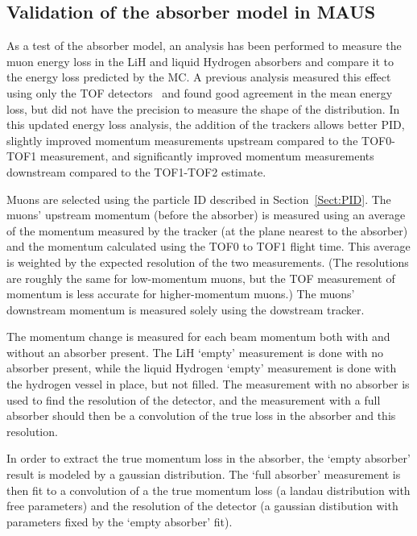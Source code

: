 \subsection{Validation of the absorber model in MAUS}
\label{SubSect:Absorber_Validation}

As a test of the absorber model, an analysis has been performed to measure the muon energy loss in the LiH and liquid Hydrogen absorbers and compare it to the energy loss predicted by the MC.  A previous analysis measured this effect using only the TOF detectors~\cite{rhys_thesis} and found good agreement in the mean energy loss, but did not have the precision to measure the shape of the distribution.  In this updated energy loss analysis, the addition of the trackers allows better PID, slightly improved momentum measurements upstream compared to the TOF0-TOF1 measurement, and significantly improved momentum measurements downstream compared to the TOF1-TOF2 estimate.

Muons are selected using the particle ID described in Section~\ref{Sect:PID}.  The muons' upstream momentum (before the absorber) is measured using an average of the momentum measured by the tracker (at the plane nearest to the absorber) and the momentum calculated using the TOF0 to TOF1 flight time.  This average is weighted by the expected resolution of the two measurements. (The resolutions are roughly the same for low-momentum muons, but the TOF measurement of momentum is less accurate for higher-momentum muons.)  The muons' downstream momentum is measured solely using the dowstream tracker.

The momentum change is measured for each beam momentum both with and without an absorber present.  The LiH `empty' measurement is done with no absorber present, while the liquid Hydrogen `empty' measurement is done with the hydrogen vessel in place, but not filled.  The measurement with no absorber is used to find the resolution of the detector, and the measurement with a full absorber should then be a convolution of the true loss in the absorber and this resolution.

In order to extract the true momentum loss in the absorber, the `empty absorber' result is modeled by a gaussian distribution.  The `full absorber' measurement is then fit to a convolution of a the true momentum loss (a landau distribution with free parameters) and the resolution of the detector (a gaussian distibution with parameters fixed by the `empty absorber' fit).

